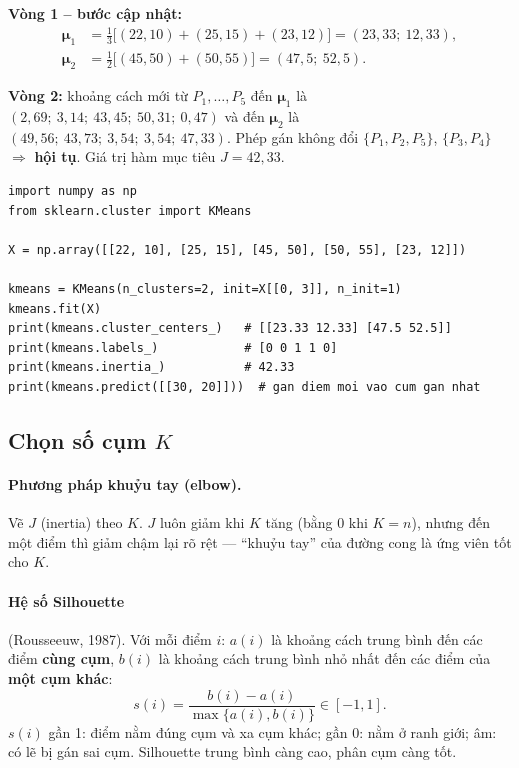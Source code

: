\noindent\textbf{Vòng 1 -- bước cập nhật:}
\begin{align*}
    \boldsymbol{\mu}_1 &= \tfrac{1}{3}\big[(22, 10) + (25, 15) + (23, 12)\big] = (23{,}33;\ 12{,}33), \\
    \boldsymbol{\mu}_2 &= \tfrac{1}{2}\big[(45, 50) + (50, 55)\big] = (47{,}5;\ 52{,}5).
\end{align*}

\noindent\textbf{Vòng 2:} khoảng cách mới từ $P_1, \dots, P_5$ đến $\boldsymbol{\mu}_1$ là $(2{,}69;\ 3{,}14;\ 43{,}45;\ 50{,}31;\ 0{,}47)$ và đến $\boldsymbol{\mu}_2$ là $(49{,}56;\ 43{,}73;\ 3{,}54;\ 3{,}54;\ 47{,}33)$. Phép gán không đổi $\{P_1, P_2, P_5\}$, $\{P_3, P_4\}$ $\Rightarrow$ \textbf{hội tụ}. Giá trị hàm mục tiêu $J = 42{,}33$.

\begin{lstlisting}[caption={K-Means với scikit-learn (ví dụ trên lớp)}]
import numpy as np
from sklearn.cluster import KMeans

X = np.array([[22, 10], [25, 15], [45, 50], [50, 55], [23, 12]])

kmeans = KMeans(n_clusters=2, init=X[[0, 3]], n_init=1)
kmeans.fit(X)
print(kmeans.cluster_centers_)   # [[23.33 12.33] [47.5 52.5]]
print(kmeans.labels_)            # [0 0 1 1 0]
print(kmeans.inertia_)           # 42.33
print(kmeans.predict([[30, 20]]))  # gan diem moi vao cum gan nhat
\end{lstlisting}


\subsection{Chọn số cụm $K$}

\paragraph{Phương pháp khuỷu tay (elbow).} Vẽ $J$ (inertia) theo $K$. $J$ luôn giảm khi $K$ tăng (bằng 0 khi $K = n$), nhưng đến một điểm thì giảm chậm lại rõ rệt --- ``khuỷu tay'' của đường cong là ứng viên tốt cho $K$.

\paragraph{Hệ số Silhouette} (Rousseeuw, 1987). Với mỗi điểm $i$: $a(i)$ là khoảng cách trung bình đến các điểm \textbf{cùng cụm}, $b(i)$ là khoảng cách trung bình nhỏ nhất đến các điểm của \textbf{một cụm khác}:
\begin{equation}
    s(i) = \frac{b(i) - a(i)}{\max\{a(i), b(i)\}} \in [-1, 1].
\end{equation}
$s(i)$ gần 1: điểm nằm đúng cụm và xa cụm khác; gần 0: nằm ở ranh giới; âm: có lẽ bị gán sai cụm. Silhouette trung bình càng cao, phân cụm càng tốt.

